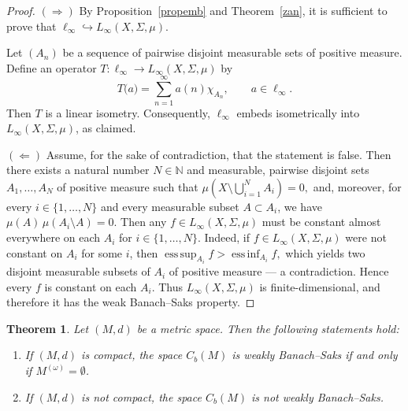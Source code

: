 \documentclass[11pt, reqno]{amsart}
\newtheorem{thm}{Theorem}[section]
\begin{document}
\begin{proof}

    $(\Longrightarrow)$ By Proposition~\ref{propemb} and Theorem~\ref{zan}, it is sufficient to prove that $\ell_\infty \hookrightarrow L_\infty(X,\Sigma,\mu).$

Let \((A_n)\) be a sequence of pairwise disjoint measurable sets of positive measure. 
Define an operator \( T : \ell_\infty \to L_\infty(X,\Sigma,\mu) \) by
\[
T\big(a\big) = \sum_{n=1}^{\infty} a(n) \chi_{A_n}, 
\qquad a \in \ell_\infty.
\]
Then \(T\) is a linear isometry. Consequently, \(\ell_\infty\) embeds isometrically 
into \(L_\infty(X,\Sigma,\mu)\), as claimed.
    
       
    $(\Longleftarrow)$ Assume, for the sake of contradiction, that the statement is false. 
Then there exists a natural number \( N \in \mathbb{N} \) and measurable, 
pairwise disjoint sets \( A_1, \dots, A_N \) of positive measure such that $
\mu\left( X \setminus \bigcup_{i=1}^{N} A_i \right) = 0,$
and, moreover, for every \( i \in \{1, \dots, N\} \) and every measurable subset 
\( A \subset A_i \), we have $\mu(A)\,\mu(A_i \setminus A) = 0.$
Then any $f \in L_\infty(X, \Sigma, \mu)$ must be constant almost everywhere on each $A_i$ for $i \in \{1, \dots, N\}$. 
Indeed, if $f \in L_\infty(X,\Sigma,\mu)$ were not constant on $A_i$ for some $i$, then $\operatorname{ess\,sup}_{A_i} f > \operatorname{ess\,inf}_{A_i} f,$
which yields two disjoint measurable subsets of $A_i$ of positive measure — a contradiction. Hence every $f$ is constant on each $A_i$. Thus $L_\infty(X,\Sigma,\mu)$ is finite-dimensional, and therefore it has the weak Banach--Saks property.
\end{proof}
\begin{thm}Let $(M,d)$ be a metric space. Then the following statements hold:
\begin{enumerate}
    \item If $(M,d)$ is compact, the space $C_b(M)$ is weakly Banach--Saks if and only if $M^{(\omega)} = \emptyset$.
    \item If $(M,d)$ is not compact, the space $C_b(M)$ is not weakly Banach--Saks.
\end{enumerate}
\end{thm}
\end{document}
